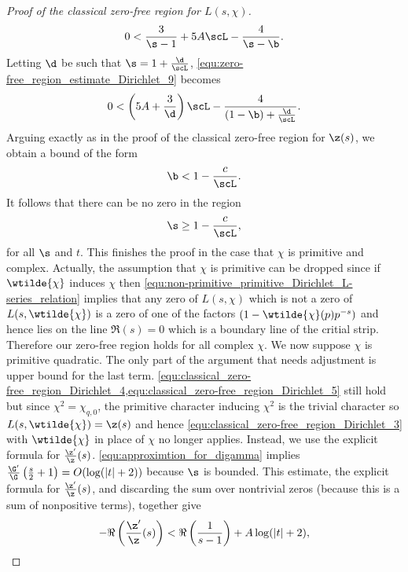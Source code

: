 \begin{proof}[Proof of the classical zero-free region for $L(s,\chi)$]
\begin{equation}
          0 < \frac{3}{\s-1}+5A\scL-\frac{4}{\s-\b}.
        \end{equation}
        Letting $\d$ be such that $\s = 1+\frac{\d}{\scL}$, \cref{equ:zero-free_region_estimate_Dirichlet_9} becomes
        \[
          0 < \left(5A+\frac{3}{\d}\right)\scL-\frac{4}{(1-\b)+\frac{\d}{\scL}}.
        \]
        Arguing exactly as in the proof of the classical zero-free region for $\z(s)$, we obtain a bound of the form
        \begin{equation}\label{equ:zero-free_region_estimate_Dirichlet_beta_bound}
          \b < 1-\frac{c}{\scL}.
        \end{equation}
        It follows that there can be no zero in the region
        \begin{equation}\label{equ:zero-free_region_estimate_Dirichlet_sigma_bound}
          \s \ge 1-\frac{c}{\scL},
        \end{equation}
        for all $\s$ and $t$. This finishes the proof in the case that $\chi$ is primitive and complex. Actually, the assumption that $\chi$ is primitive can be dropped since if $\wtilde{\chi}$ induces $\chi$ then \cref{equ:non-primitive_primitive_Dirichlet_L-series_relation} implies that any zero of $L(s,\chi)$ which is not a zero of $L(s,\wtilde{\chi})$ is a zero of one of the factors $(1-\wtilde{\chi}(p)p^{-s})$ and hence lies on the line $\Re(s) = 0$ which is a boundary line of the critial strip. Therefore our zero-free region holds for all complex $\chi$. We now suppose $\chi$ is primitive quadratic. The only part of the argument that needs adjustment is upper bound for the last term. \cref{equ:classical_zero-free_region_Dirichlet_4,equ:classical_zero-free_region_Dirichlet_5} still hold but since $\chi^{2} = \chi_{q,0}$, the primitive character inducing $\chi^{2}$ is the trivial character so $L(s,\wtilde{\chi}) = \z(s)$ and hence \cref{equ:classical_zero-free_region_Dirichlet_3} with $\wtilde{\chi}$ in place of $\chi$ no longer applies. Instead, we use the explicit formula for $\frac{\z'}{\z}(s)$. \cref{equ:approximtion_for_digamma} implies $\frac{\G'}{\G}\left(\frac{s}{2}+1\right) = O(\log(|t|+2))$ because $\s$ is bounded. This estimate, the explicit formula for $\frac{\z'}{\z}(s)$, and discarding the sum over nontrivial zeros (because this is a sum of nonpositive terms), together give
        \begin{equation}\label{equ:classical_zero-free_region_Dirichlet_10}
          -\Re\left(\frac{\z'}{\z}(s)\right) < \Re\left(\frac{1}{s-1}\right)+A\log(|t|+2),
        \end{equation}

\end{proof}
